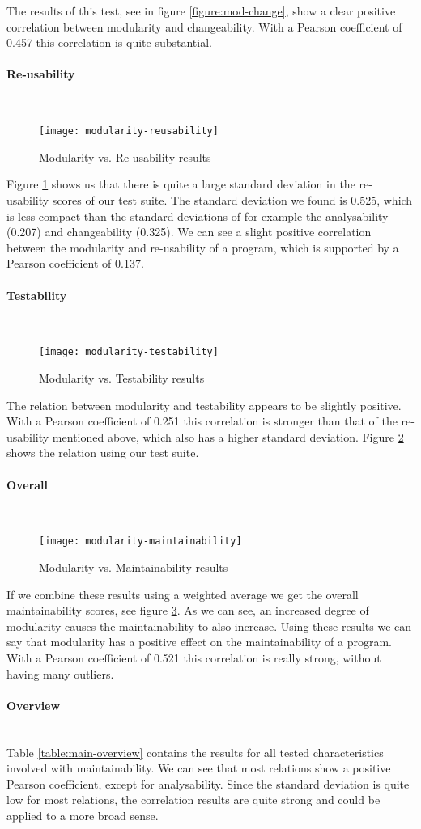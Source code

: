 \documentclass[twoside]{uva-inf-bachelor-thesis}
\newcommand{\myparagraph}[1]{\paragraph{#1}\mbox{}\\}
\begin{document}
The results of this test, see in figure \ref{figure:mod-change}, show a clear positive correlation between modularity and changeability. With a Pearson coefficient of 0.457 this correlation is quite substantial. 

\myparagraph{Re-usability}
\begin{figure}[H]
    \caption{Modularity vs. Re-usability results}
    \label{figure:mod-reuse}
    \centering
        \texttt{[image: modularity-reusability]}
\end{figure}

Figure \ref{figure:mod-reuse} shows us that there is quite a large standard deviation in the re-usability scores of our test suite. The standard deviation we found is 0.525, which is less compact than the standard deviations of for example the analysability (0.207) and changeability (0.325). We can see a slight positive correlation between the modularity and re-usability of a program, which is supported by a Pearson coefficient of 0.137.

\myparagraph{Testability}
\begin{figure}[H]
    \caption{Modularity vs. Testability results}
    \label{figure:mod-test}
    \centering
        \texttt{[image: modularity-testability]}
\end{figure}

The relation between modularity and testability appears to be slightly positive. With a Pearson coefficient of 0.251 this correlation is stronger than that of the re-usability mentioned above, which also has a higher standard deviation. Figure \ref{figure:mod-test} shows the relation using our test suite.

\myparagraph{Overall}
\begin{figure}[H]
    \caption{Modularity vs. Maintainability results}
    \label{figure:mod-main}
    \centering
        \texttt{[image: modularity-maintainability]}
\end{figure}

If we combine these results using a weighted average we get the overall maintainability scores, see figure \ref{figure:mod-main}. As we can see, an increased degree of modularity causes the maintainability to also increase. Using these results we can say that modularity has a positive effect on the maintainability of a program. With a Pearson coefficient of 0.521 this correlation is really strong, without having many outliers.

\myparagraph{Overview}
Table \ref{table:main-overview} contains the results for all tested characteristics involved with maintainability. We can see that most relations show a positive Pearson coefficient, except for analysability. Since the standard deviation is quite low for most relations, the correlation results are quite strong and could be applied to a more broad sense.
\end{document}
